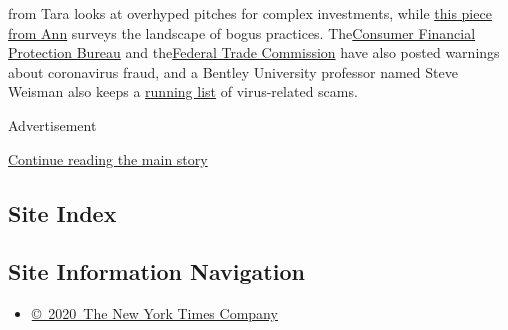 \begin{itemize}
{  from Tara} looks at overhyped pitches for complex investments, while
  \href{https://www.nytimes3xbfgragh.onion/2020/04/17/your-money/coronavirus-fraud.html}{this
  piece from Ann} surveys the landscape of bogus practices.
  The\href{https://www.consumerfinance.gov/about-us/blog/beware-coronavirus-related-scams/}{Consumer
  Financial Protection Bureau} and
  the\href{https://www.consumer.ftc.gov/features/coronavirus-scams-what-ftc-doing}{Federal
  Trade Commission} have also posted warnings about coronavirus fraud,
  and a Bentley University professor named Steve Weisman also keeps a
  \href{https://scamicide.com/tag/coronavirus-scams/}{running list} of
  virus-related scams.
\end{itemize}

Advertisement

\protect\hyperlink{after-bottom}{Continue reading the main story}

\hypertarget{site-index}{%
\subsection{Site Index}\label{site-index}}

\hypertarget{site-information-navigation}{%
\subsection{Site Information
Navigation}\label{site-information-navigation}}

\begin{itemize}
\tightlist
\item
  \href{https://help.nytimes3xbfgragh.onion/hc/en-us/articles/115014792127-Copyright-notice}{©~2020~The
  New York Times Company}
\end{itemize}

